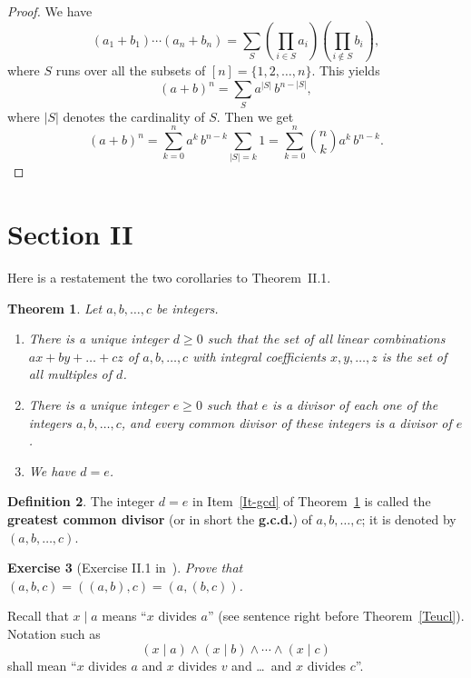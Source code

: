 \documentclass[12pt,letterpaper]{article}
\newtheorem{thm}{Theorem}%
\newtheorem{exer}[thm]{Exercise}
\theoremstyle{definition}
\newtheorem{defn}[thm]{Definition}
\begin{document}
\begin{proof}
We have 
$$
(a_1+b_1)\cdots(a_n+b_n)=\sum_S \left(\prod_{i\in S} a_i\right) \left(\prod_{i\notin S} b_i\right),
$$ 
where $S$ runs over all the subsets of $[n]=\{1,2,\ldots,n\}$. This yields 
$$
(a+b)^n=\sum_S a^{|S|}\, b^{n-|S|},
$$ 
where $|S|$ denotes the cardinality of $S$. Then we get 
$$
(a+b)^n=\sum_{k=0}^n a^k\, b^{n-k} \sum_{|S|=k} 1 = \sum_{k=0}^n \binom{n}{k} a^k\, b^{n-k}.
$$ 
\end{proof}

\section{Section II} 

Here is a restatement the two corollaries to Theorem~II.1. 

\begin{thm}\label{Tgcd}
Let $a,b,\ldots,c$ be integers. 
\begin{enumerate}
\item There is a unique integer $d\ge0$ such that the set of all linear combinations $ax+by+\ldots+cz$ of $a,b,\ldots,c$ with integral coefficients $x,y,\ldots,z$ is the set of all multiples of $d$. 
\item There is a unique integer $e\ge0$ such that $e$ is a divisor of each one of the integers $a,b,\ldots,c$, and every common divisor of these integers is a divisor of $e$. 
\item We have $d=e$. \label{It-gcd}
\end{enumerate}
\end{thm}

\begin{defn}\label{Dgcd} 
The integer $d=e$ in Item~\ref{It-gcd} of Theorem~\ref{Tgcd} is called the \textbf{greatest common divisor}  (or in short the \textbf{g.c.d.})  of $a,b,\ldots,c$; it is denoted by $(a,b,\ldots,c)$.
\end{defn}

\begin{exer}[Exercise II.1 in~\cite{weil1979}]\label{ExII1}
Prove that $(a,b,c)=((a,b),c)=(a,(b,c))$.
\end{exer} 

Recall that $x\mid a$ means ``$x$ divides $a$'' (see sentence right before Theorem~\ref{Teucl}). Notation such as 
$$
(x\mid a)\land(x\mid b)\land\cdots\land(x\mid c)
$$ 
shall mean ``$x$ divides $a$ and $x$ divides $v$ and \ldots\ and $x$ divides $c$''. 
\end{document}
